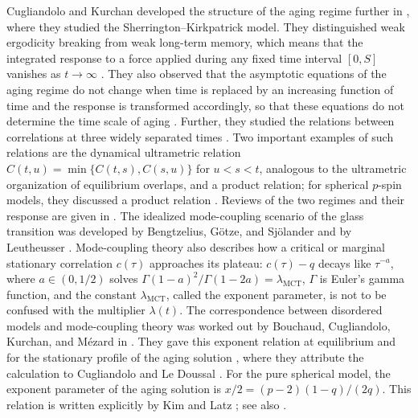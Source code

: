 Cugliandolo and Kurchan developed the structure of the aging regime further in \cite{ck1994}, where they studied the Sherrington--Kirkpatrick model. They distinguished weak ergodicity breaking from weak long-term memory, which means that the integrated response to a force applied during any fixed time interval $[0,S]$ vanishes as $t\to\infty$ \cite[arXiv version~1, Section~3]{ck1994}. They also observed that the asymptotic equations of the aging regime do not change when time is replaced by an increasing function of time and the response is transformed accordingly, so that these equations do not determine the time scale of aging \cite[arXiv version~1, Section~4]{ck1994}. Further, they studied the relations between correlations at three widely separated times \cite[arXiv version~1, Section~5]{ck1994}. Two important examples of such relations are the dynamical ultrametric relation $C(t,u)=\min\{C(t,s),C(s,u)\}$ for $u<s<t$, analogous to the ultrametric organization of equilibrium overlaps, and a product relation; for spherical $p$-spin models, they discussed a product relation \cite[arXiv version~1, Section~5.1, Equation~(5.1.8)]{ck1994}. Reviews of the two regimes and their response are given in \cite{bckm1998,cugliandolo2004}. The idealized mode-coupling scenario of the glass transition was developed by Bengtzelius, G\"otze, and Sj\"olander and by Leutheusser \cite{bgs1984,leutheusser1984}. Mode-coupling theory also describes how a critical or marginal stationary correlation $c(\tau)$ approaches its plateau: $c(\tau)-q$ decays like $\tau^{-a}$, where $a\in(0,1/2)$ solves $\Gamma(1-a)^2/\Gamma(1-2a)=\lambda_{\mathrm{MCT}}$, $\Gamma$ is Euler's gamma function, and the constant $\lambda_{\mathrm{MCT}}$, called the exponent parameter, is not to be confused with the multiplier $\lambda(t)$. The correspondence between disordered models and mode-coupling theory was worked out by Bouchaud, Cugliandolo, Kurchan, and M\'ezard in \cite{bckm1996}. They gave this exponent relation at equilibrium \cite[arXiv version, Equation~(IV.3)]{bckm1996} and for the stationary profile of the aging solution \cite[arXiv version, Equation~(IV.6)]{bckm1996}, where they attribute the calculation to Cugliandolo and Le Doussal \cite{cugliandololedoussal1996}. For the pure spherical model, the exponent parameter of the aging solution is $x/2=(p-2)(1-q)/(2q)$. This relation is written explicitly by Kim and Latz \cite[the paragraph after Equation~(12)]{kimlatz2001}; see also \cite[arXiv version~2, Equation~(12.36)]{cugliandolo2004}.

